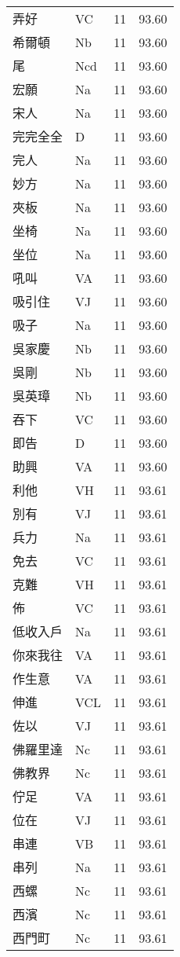 \documentclass[twocolumn]{book}
\begin{document}
\begin{supertabular}{llrr}
弄好 & VC & 11 &  93.60\\
希爾頓 & Nb & 11 &  93.60\\
尾 & Ncd & 11 &  93.60\\
宏願 & Na & 11 &  93.60\\
宋人 & Na & 11 &  93.60\\
完完全全 & D & 11 &  93.60\\
完人 & Na & 11 &  93.60\\
妙方 & Na & 11 &  93.60\\
夾板 & Na & 11 &  93.60\\
坐椅 & Na & 11 &  93.60\\
坐位 & Na & 11 &  93.60\\
吼叫 & VA & 11 &  93.60\\
吸引住 & VJ & 11 &  93.60\\
吸子 & Na & 11 &  93.60\\
吳家慶 & Nb & 11 &  93.60\\
吳剛 & Nb & 11 &  93.60\\
吳英璋 & Nb & 11 &  93.60\\
吞下 & VC & 11 &  93.60\\
即告 & D & 11 &  93.60\\
助興 & VA & 11 &  93.60\\
利他 & VH & 11 &  93.61\\
別有 & VJ & 11 &  93.61\\
兵力 & Na & 11 &  93.61\\
免去 & VC & 11 &  93.61\\
克難 & VH & 11 &  93.61\\
佈 & VC & 11 &  93.61\\
低收入戶 & Na & 11 &  93.61\\
你來我往 & VA & 11 &  93.61\\
作生意 & VA & 11 &  93.61\\
伸進 & VCL & 11 &  93.61\\
佐以 & VJ & 11 &  93.61\\
佛羅里達 & Nc & 11 &  93.61\\
佛教界 & Nc & 11 &  93.61\\
佇足 & VA & 11 &  93.61\\
位在 & VJ & 11 &  93.61\\
串連 & VB & 11 &  93.61\\
串列 & Na & 11 &  93.61\\
西螺 & Nc & 11 &  93.61\\
西濱 & Nc & 11 &  93.61\\
西門町 & Nc & 11 &  93.61\\

\end{supertabular}
\end{document}
